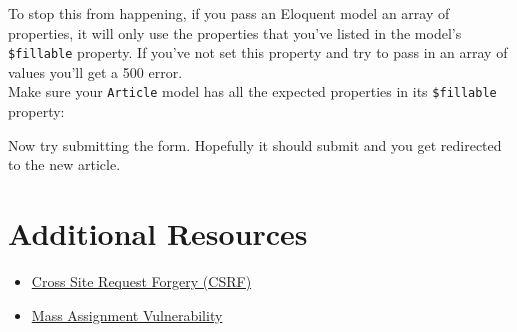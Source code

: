 To stop this from happening, if you pass an Eloquent model an array of properties, it will only use the properties that you've listed in the model's \texttt{\$fillable} property. If you've not set this property and try to pass in an array of values you'll get a 500 error.
\\

Make sure your \texttt{Article} model has all the expected properties in its \texttt{\$fillable} property:


Now try submitting the form. Hopefully it should submit and you get redirected to the new article.


\section{Additional Resources}

\begin{itemize}[leftmargin=*]
    \item \href{https://owasp.org/www-community/attacks/csrf}{Cross Site Request Forgery (CSRF)}
    \item \href{https://cheatsheetseries.owasp.org/cheatsheets/Mass_Assignment_Cheat_Sheet.html}{Mass Assignment Vulnerability}
\end{itemize}
